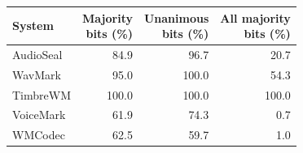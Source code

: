 \begin{tabular}{lrrr}
\toprule
System & \shortstack{Majority\\bits (\%)} & \shortstack{Unanimous\\bits (\%)} & \shortstack{All majority\\bits (\%)} \\
\midrule
AudioSeal & 84.9 & 96.7 & 20.7 \\
WavMark & 95.0 & 100.0 & 54.3 \\
TimbreWM & 100.0 & 100.0 & 100.0 \\
VoiceMark & 61.9 & 74.3 & 0.7 \\
WMCodec & 62.5 & 59.7 & 1.0 \\
\bottomrule
\end{tabular}
